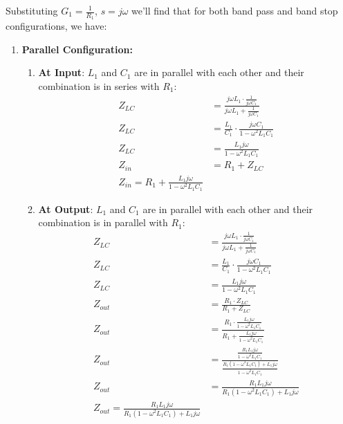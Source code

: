 \begin{enumerate}
    Substituting \(G_1 = \frac{1}{R_1}\), \(s = j \omega\) we'll
    find that for both band pass and band stop configurations, we have:\\
    \begin{enumerate}
      \item \textbf{Parallel Configuration:}
        \begin{enumerate}
          \item \textbf{At Input}:
            \(L_1\) and \(C_1\) are in parallel with each other and
            their combination is in series with \(R_1\):
            \begin{align*}
              Z_{LC} &= \frac{j \omega L_1 \cdot \frac{1}{j \omega C_1}}{j \omega L_1 + \frac{1}{j \omega C_1}} \\
              Z_{LC} &= \frac{L_1}{C_1} \cdot \frac{j \omega C_1}{1 - \omega^2 L_1 C_1} \\
              Z_{LC} &= \frac{L_1 j \omega}{1 - \omega^2 L_1 C_1} \\
              Z_{in} &= R_1 + Z_{LC} \\
              Z_{in} = R_1 + \frac{L_1 j \omega}{1 - \omega^2 L_1 C_1}
            \end{align*}
          \item \textbf{At Output}:
            \(L_1\) and \(C_1\) are in parallel with each other and
            their combination is in parallel with \(R_1\):
            \begin{align*}
              Z_{LC} &= \frac{j \omega L_1 \cdot \frac{1}{j \omega C_1}}{j \omega L_1 + \frac{1}{j \omega C_1}} \\
              Z_{LC} &= \frac{L_1}{C_1} \cdot \frac{j \omega C_1}{1 - \omega^2 L_1 C_1} \\
              Z_{LC} &= \frac{L_1 j \omega}{1 - \omega^2 L_1 C_1} \\
              Z_{out} &= \frac{R_1 \cdot Z_{LC}}{R_1 + Z_{LC}} \\
              Z_{out} &= \frac{R_1 \cdot \frac{L_1 j \omega}{1 - \omega^2 L_1 C_1}}{R_1 + \frac{L_1 j \omega}{1 - \omega^2 L_1 C_1}} \\
              Z_{out} &= \frac{\frac{R_1 L_1 j \omega}{1 - \omega^2 L_1 C_1}}{\frac{R_1(1 - \omega^2 L_1 C_1) + L_1 j \omega}{1 - \omega^2 L_1 C_1}} \\
              Z_{out} &= \frac{R_1 L_1 j \omega}{R_1(1 - \omega^2 L_1 C_1) + L_1 j \omega} \\
              Z_{out} = \frac{R_1 L_1 j \omega}{R_1(1 - \omega^2 L_1 C_1) + L_1 j \omega}

\end{align*}
\end{enumerate}
\end{enumerate}
\end{enumerate}
